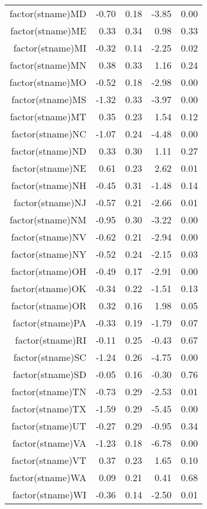 \begin{table}[ht]
\begin{tabular}{rrrrr}
  factor(stname)MD & -0.70 & 0.18 & -3.85 & 0.00 \\ 
  factor(stname)ME & 0.33 & 0.34 & 0.98 & 0.33 \\ 
  factor(stname)MI & -0.32 & 0.14 & -2.25 & 0.02 \\ 
  factor(stname)MN & 0.38 & 0.33 & 1.16 & 0.24 \\ 
  factor(stname)MO & -0.52 & 0.18 & -2.98 & 0.00 \\ 
  factor(stname)MS & -1.32 & 0.33 & -3.97 & 0.00 \\ 
  factor(stname)MT & 0.35 & 0.23 & 1.54 & 0.12 \\ 
  factor(stname)NC & -1.07 & 0.24 & -4.48 & 0.00 \\ 
  factor(stname)ND & 0.33 & 0.30 & 1.11 & 0.27 \\ 
  factor(stname)NE & 0.61 & 0.23 & 2.62 & 0.01 \\ 
  factor(stname)NH & -0.45 & 0.31 & -1.48 & 0.14 \\ 
  factor(stname)NJ & -0.57 & 0.21 & -2.66 & 0.01 \\ 
  factor(stname)NM & -0.95 & 0.30 & -3.22 & 0.00 \\ 
  factor(stname)NV & -0.62 & 0.21 & -2.94 & 0.00 \\ 
  factor(stname)NY & -0.52 & 0.24 & -2.15 & 0.03 \\ 
  factor(stname)OH & -0.49 & 0.17 & -2.91 & 0.00 \\ 
  factor(stname)OK & -0.34 & 0.22 & -1.51 & 0.13 \\ 
  factor(stname)OR & 0.32 & 0.16 & 1.98 & 0.05 \\ 
  factor(stname)PA & -0.33 & 0.19 & -1.79 & 0.07 \\ 
  factor(stname)RI & -0.11 & 0.25 & -0.43 & 0.67 \\ 
  factor(stname)SC & -1.24 & 0.26 & -4.75 & 0.00 \\ 
  factor(stname)SD & -0.05 & 0.16 & -0.30 & 0.76 \\ 
  factor(stname)TN & -0.73 & 0.29 & -2.53 & 0.01 \\ 
  factor(stname)TX & -1.59 & 0.29 & -5.45 & 0.00 \\ 
  factor(stname)UT & -0.27 & 0.29 & -0.95 & 0.34 \\ 
  factor(stname)VA & -1.23 & 0.18 & -6.78 & 0.00 \\ 
  factor(stname)VT & 0.37 & 0.23 & 1.65 & 0.10 \\ 
  factor(stname)WA & 0.09 & 0.21 & 0.41 & 0.68 \\ 
  factor(stname)WI & -0.36 & 0.14 & -2.50 & 0.01 \\ 

\end{tabular}
\end{table}
